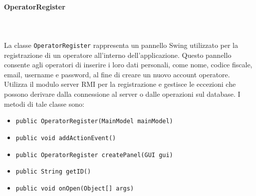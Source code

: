 \paragraph{OperatorRegister}\\
\\
La classe \texttt{OperatorRegister} rappresenta un pannello Swing utilizzato per la registrazione di un operatore all'interno dell'applicazione.
Questo pannello consente agli operatori di inserire i loro dati personali, come nome, codice fiscale, email, username e password, al fine di creare un nuovo account operatore.
Utilizza il modulo server RMI per la registrazione e gestisce le eccezioni che possono derivare dalla connessione al server o dalle operazioni sul database.
I metodi di tale classe sono:
\begin{itemize}
    \item \texttt{public OperatorRegister(MainModel mainModel)}
    \item \texttt{public void addActionEvent()}
    \item \texttt{public OperatorRegister createPanel(GUI gui)}
    \item \texttt{public String getID()}
    \item \texttt{public void onOpen(Object[] args)}
\end{itemize}